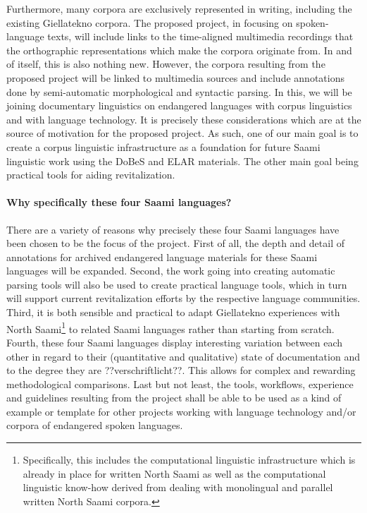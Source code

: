 \documentclass[a4paper,12pt]{article}
\begin{document}
Furthermore, many corpora are exclusively represented in writing, including the existing Giellatekno corpora. The proposed project, in focusing on spoken-language texts, will include links to the time-aligned multimedia recordings that the orthographic representations which make the corpora originate from. In and of itself, this is also nothing new. However, the corpora resulting from the proposed project will be linked to multimedia sources and include annotations done by semi-automatic morphological and syntactic parsing. In this, we will be joining documentary linguistics on endangered languages with corpus linguistics and with language technology. It is precisely these considerations which are at the source of motivation for the proposed project. As such, one of our main goal is to create a corpus linguistic infrastructure as a foundation for future Saami linguistic work using the DoBeS and ELAR materials. The other main goal being practical tools for aiding revitalization.

\paragraph{Why specifically these four Saami languages?}%
There are a variety of reasons why precisely these four Saami languages have been chosen to be the focus of the project. First of all, the depth and detail of annotations for archived endangered language materials for these Saami languages will be expanded. Second, the work going into creating automatic parsing tools will also be used to create practical language tools, which in turn will support current revitalization efforts by the respective language communities. Third, it is both sensible and practical to adapt Giellatekno experiences with North Saami\footnote{Specifically, this includes the computational linguistic infrastructure which is already in place for written North Saami as well as the computational linguistic know-how derived from dealing with monolingual and parallel written North Saami corpora.} to related Saami languages rather than starting from scratch. Fourth, these four Saami languages display interesting variation between each other %
 in regard to their (quantitative and qualitative) state of documentation and to the degree they are ??verschriftlicht??. This allows for complex and rewarding methodological comparisons. Last but not least, the tools, workflows, experience and guidelines resulting from the project shall be able to be used as a kind of example or template for other projects working with language technology and/or corpora of endangered spoken languages.
\end{document}
